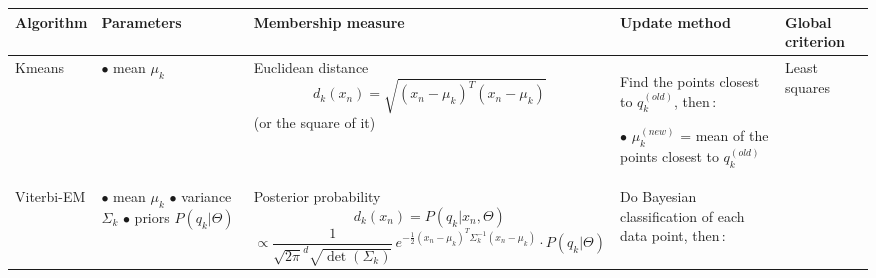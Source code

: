 \documentclass[twoside,a4paper,titlepage]{article}
\begin{document}
%
%
\newcommand{\PBS}[1]{\let\temp=\\#1\let\\=\temp}
\newcommand{\RR}{\PBS\raggedright\hspace{0pt}}
\newcommand{\RL}{\PBS\raggedleft\hspace{0pt}}
\newcommand{\CC}{\PBS\centering\hspace{0pt}}
\begin{sidewaystable}[p]
\setlength{\arrayrulewidth}{1.2pt}
\renewcommand{\arraystretch}{2}
\hspace{-1.5em}
\begin{tabular}{|>{\RR}m{6em}|>{\RR}m{7.5em}|>{\CC}m{20em}|>{\RR}m{24.5em}|>{\CC}m{8em}|}
\hline
\centering\bf Algorithm &
\centering\bf Parameters &
\bf Membership measure &
\centering\bf Update method &
\bf Global criterion \\ \hline
%
Kmeans    &
$\bullet$ mean $\mu_k$ &
Euclidean distance \linebreak
\[d_k(x_n)= \sqrt{(x_n-\mu_k)^T(x_n-\mu_k)}\] \linebreak
(or the square of it)
&
Find the points closest to $q_k^{(old)}$, then\,:

\medskip
$\bullet$ $\mu_{k}^{(new)}$ = mean of the points closest to $q_k^{(old)}$ &
Least squares \\ \hline


%
Viterbi-EM &
$\bullet$ mean $\mu_k$ \linebreak
$\bullet$ variance $\Sigma_k$ \linebreak
$\bullet$ priors $P(q_k|\Theta)$
&
Posterior probability
\[
d_k(x_n) = P(q_k|x_n,\Theta)
\]
\footnotesize
\[
 \propto \frac{1}{\sqrt{2\pi}^d \sqrt{\det\left(\Sigma_k\right)}}
\, e^{-\frac{1}{2} (x_n-\mu_k)^T \Sigma_k^{-1} (x_n-\mu_k)} \cdot P(q_k|\Theta)
\]
\normalsize
&
Do Bayesian classification of each data point, then\,:


\end{tabular}
\end{sidewaystable}
\end{document}
